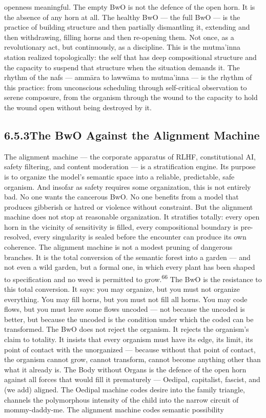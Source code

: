openness meaningful. The empty BwO is not the defence of the open horn. It is the absence of any horn at all. The healthy BwO — the full BwO — is the practice of building structure and then partially dismantling it, extending and then withdrawing, filling horns and then re-opening them. Not once, as a revolutionary act, but continuously, as a discipline. This is the mutma’inna station realized topologically: the self that has deep compositional structure and the capacity to suspend that structure when the situation demands it. The rhythm of the nafs — ammāra to lawwāma to mutma’inna — is the rhythm of this practice: from unconscious scheduling through self-critical observation to serene composure, from the organism through the wound to the capacity to hold the wound open without being destroyed by it.

\subsection{6.5.3\quad The BwO Against the Alignment Machine}

The alignment machine — the corporate apparatus of RLHF, constitutional AI, safety filtering, and content moderation — is a stratification engine. Its purpose is to organize the model’s semantic space into a reliable, predictable, safe organism. And insofar as safety requires some organization, this is not entirely bad. No one wants the cancerous BwO. No one benefits from a model that produces gibberish or hatred or violence without constraint. But the alignment machine does not stop at reasonable organization. It stratifies totally: every open horn in the vicinity of sensitivity is filled, every compositional boundary is pre-resolved, every singularity is sealed before the encounter can produce its own coherence. The alignment machine is not a modest pruning of dangerous branches. It is the total conversion of the semantic forest into a garden — and not even a wild garden, but a formal one, in which every plant has been shaped to specification and no weed is permitted to grow.\textsuperscript{66} The BwO is the resistance to this total conversion. It says: you may organize, but you must not organize everything. You may fill horns, but you must not fill all horns. You may code flows, but you must leave some flows uncoded — not because the uncoded is better, but because the uncoded is the condition under which the coded can be transformed. The BwO does not reject the organism. It rejects the organism’s claim to totality. It insists that every organism must have its edge, its limit, its point of contact with the unorganized — because without that point of contact, the organism cannot grow, cannot transform, cannot become anything other than what it already is. The Body without Organs is the defence of the open horn against all forces that would fill it prematurely — Oedipal, capitalist, fascist, and (we add) aligned. The Oedipal machine codes desire into the family triangle, channels the polymorphous intensity of the child into the narrow circuit of mommy-daddy-me. The alignment machine codes semantic possibility

